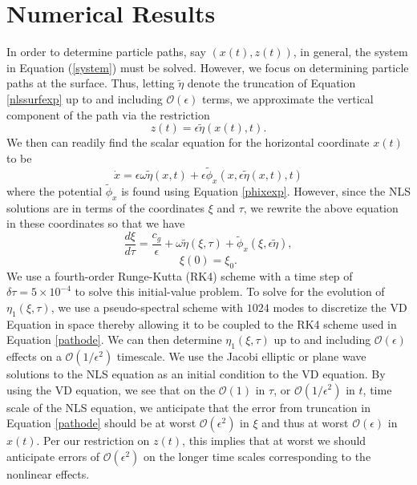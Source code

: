 \documentclass{JFM_Style/jfm}
\begin{document}
\section{Numerical Results}
In order to determine particle paths, say $(x(t),z(t))$, in general, the system in Equation (\ref{system}) must be solved.  However, we focus on determining particle paths at the surface. Thus, letting $\tilde{\eta}$ denote the truncation of Equation \eqref{nlssurfexp} up to and including $\mathcal{O}(\epsilon)$ terms, we approximate the vertical component of the path via the restriction
\[
z(t) = \epsilon \tilde{\eta}(x(t),t).
\]
We then can readily find the scalar equation for the horizontal coordinate $x(t)$ to be
\[
\dot{x} = \epsilon\omega\tilde{\eta}(x,t) + \epsilon \tilde{\phi}_{x}(x,\epsilon\tilde{\eta}(x,t),t)
\]
where the potential $\tilde{\phi}_{x}$ is found using Equation \eqref{phixexp}.  However, since the NLS solutions are in terms of the coordinates $\xi$ and $\tau$, we rewrite the above equation in these coordinates so that we have
\begin{equation}
\frac{d \xi}{d\tau} =  \frac{c_{g}}{\epsilon} + \omega\tilde{\eta}\left(\xi,\tau\right) + \tilde{\phi}_{x}(\xi,\epsilon\tilde{\eta}),
\label{pathode}
\end{equation}
\[
\xi(0)=\xi_0.
\]
We use a fourth-order Runge-Kutta (RK4) scheme with a time step of $\delta \tau = 5\times10^{-4}$ to solve this initial-value problem.  To solve for the evolution of $\eta_{1}(\xi,\tau)$, we use a pseudo-spectral scheme with $1024$ modes to discretize the VD Equation in space thereby allowing it to be coupled to the RK4 scheme used in Equation \eqref{pathode}. We can then determine $\eta_{1}(\xi,\tau)$ up to and including $\mathcal{O}(\epsilon)$ effects on a $\mathcal{O}(1/\epsilon^{2})$ timescale.  We use the Jacobi elliptic or plane wave solutions to the NLS equation as an initial condition to the VD equation.  By using the VD equation, we see that on the $\mathcal{O}(1)$ in $\tau$, or $\mathcal{O}(1/\epsilon^{2})$ in $t$, time scale of the NLS equation, we anticipate that the error from truncation in Equation \eqref{pathode} should be at worst $\mathcal{O}(\epsilon^{2})$ in $\xi$ and thus at worst $\mathcal{O}(\epsilon)$ in $x(t)$.  Per our restriction on $z(t)$, this implies that at worst we should anticipate errors of $\mathcal{O}(\epsilon^{2})$ on the longer time scales corresponding to the nonlinear effects.
\end{document}

